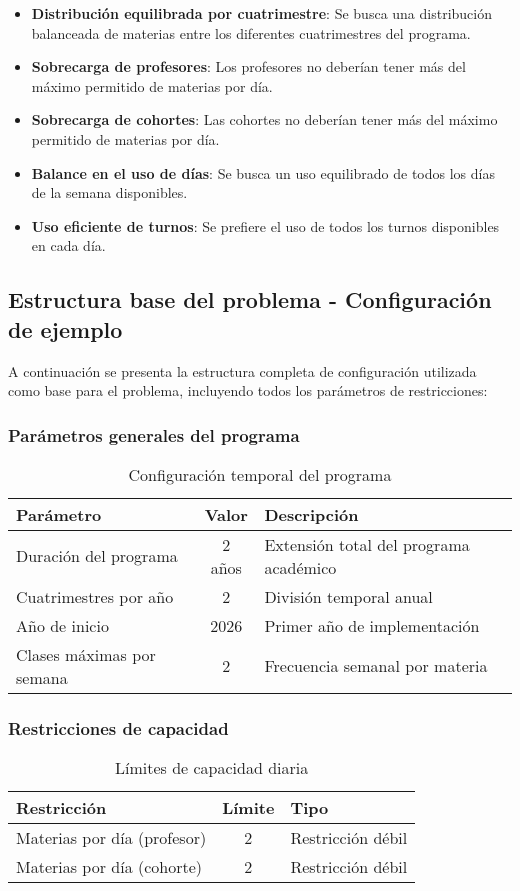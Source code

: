 \begin{itemize}
    \item \textbf{Distribución equilibrada por cuatrimestre}: Se busca una distribución balanceada de materias entre los diferentes cuatrimestres del programa.
    \item \textbf{Sobrecarga de profesores}: Los profesores no deberían tener más del máximo permitido de materias por día.
    \item \textbf{Sobrecarga de cohortes}: Las cohortes no deberían tener más del máximo permitido de materias por día.
    \item \textbf{Balance en el uso de días}: Se busca un uso equilibrado de todos los días de la semana disponibles.
    \item \textbf{Uso eficiente de turnos}: Se prefiere el uso de todos los turnos disponibles en cada día.
\end{itemize}

\newpage
\subsection{Estructura base del problema - Configuración de ejemplo}
A continuación se presenta la estructura completa de configuración utilizada como base para el problema, incluyendo todos los parámetros de restricciones:

\subsubsection{Parámetros generales del programa}
\begin{table}[ht]
\centering
\begin{tabular}{|l|c|l|}
\hline
\textbf{Parámetro} & \textbf{Valor} & \textbf{Descripción} \\
\hline
Duración del programa & 2 años & Extensión total del programa académico \\
Cuatrimestres por año & 2 & División temporal anual \\
Año de inicio & 2026 & Primer año de implementación \\
Clases máximas por semana & 2 & Frecuencia semanal por materia \\
\hline
\end{tabular}
\caption{Configuración temporal del programa}
\end{table}

\subsubsection{Restricciones de capacidad}
\begin{table}[ht]
\centering
\begin{tabular}{|l|c|l|}
\hline
\textbf{Restricción} & \textbf{Límite} & \textbf{Tipo} \\
\hline
Materias por día (profesor) & 2 & Restricción débil \\
Materias por día (cohorte) & 2 & Restricción débil \\
\hline
\end{tabular}
\caption{Límites de capacidad diaria}
\end{table}

